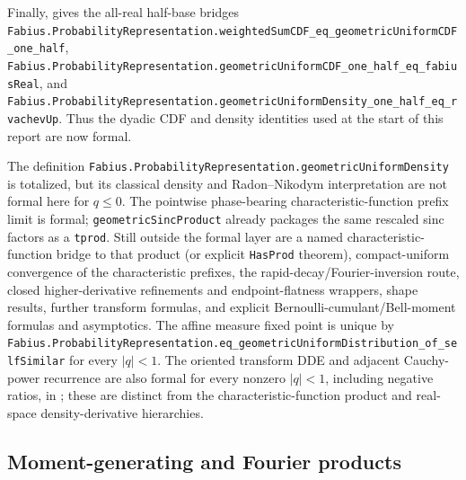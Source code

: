 \documentclass[11pt,oneside]{article}
\theoremstyle{definition}
\theoremstyle{remark}
\newcommand{\1}{\mathbf 1}
\begin{document}
\begin{statusbox}
Finally,  gives the all-real half-base bridges
\nolinkurl{Fabius.ProbabilityRepresentation.weightedSumCDF_eq_geometricUniformCDF_one_half},
\nolinkurl{Fabius.ProbabilityRepresentation.geometricUniformCDF_one_half_eq_fabiusReal},
and
\nolinkurl{Fabius.ProbabilityRepresentation.geometricUniformDensity_one_half_eq_rvachevUp}.
Thus the dyadic CDF and density identities used at the start of this report are now formal.

The definition \nolinkurl{Fabius.ProbabilityRepresentation.geometricUniformDensity} is
totalized, but its classical density and Radon--Nikodym interpretation are not formal here for
\(q\le0\).  The pointwise phase-bearing characteristic-function prefix limit is formal;
\nolinkurl{geometricSincProduct} already packages the same rescaled sinc factors as a
\nolinkurl{tprod}.  Still outside the formal layer are a named characteristic-function
bridge to that product (or explicit \nolinkurl{HasProd} theorem), compact-uniform
convergence of the characteristic prefixes, the rapid-decay/Fourier-inversion route, closed higher-derivative refinements
and endpoint-flatness wrappers, shape results, further transform formulas, and explicit
Bernoulli-cumulant/Bell-moment formulas and asymptotics.
The affine measure fixed point is unique by
\nolinkurl{Fabius.ProbabilityRepresentation.eq_geometricUniformDistribution_of_selfSimilar}
for every \(|q|<1\).  The oriented transform DDE and adjacent Cauchy-power recurrence are
also formal for every nonzero \(|q|<1\), including negative ratios, in
; these are distinct from the characteristic-function
product and real-space density-derivative hierarchies.
\end{statusbox}

\subsection{Moment-generating and Fourier products}
\end{document}
